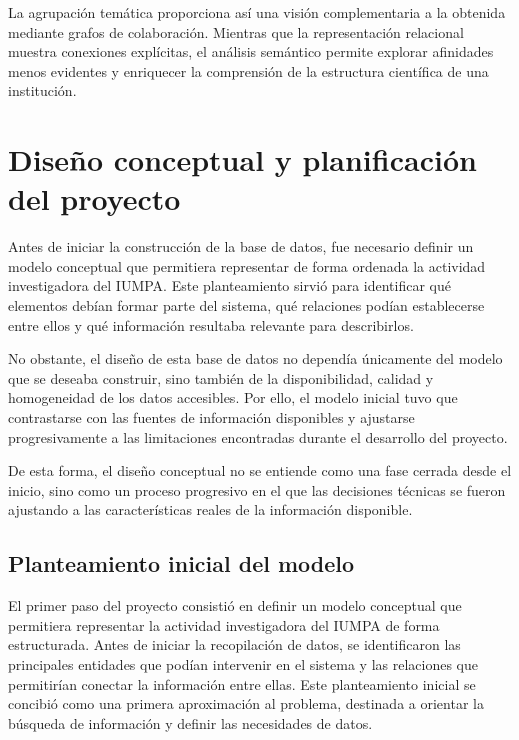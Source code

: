 \documentclass[11pt,spanish,listoffigures,listoftables]{tfgetsinf}
\begin{document}
La agrupación temática proporciona así una visión complementaria a la obtenida mediante grafos de colaboración. Mientras que la representación relacional muestra conexiones explícitas, el análisis semántico permite explorar afinidades menos evidentes y enriquecer la comprensión de la estructura científica de una institución.



\chapter{Diseño conceptual y planificación del proyecto}

Antes de iniciar la construcción de la base de datos, fue necesario definir un modelo conceptual que permitiera representar de forma ordenada la actividad investigadora del IUMPA. Este planteamiento sirvió para identificar qué elementos debían formar parte del sistema, qué relaciones podían establecerse entre ellos y qué información resultaba relevante para describirlos.

No obstante, el diseño de esta base de datos no dependía únicamente del modelo que se deseaba construir, sino también de la disponibilidad, calidad y homogeneidad de los datos accesibles. Por ello, el modelo inicial tuvo que contrastarse con las fuentes de información disponibles y ajustarse progresivamente a las limitaciones encontradas durante el desarrollo del proyecto.

De esta forma, el diseño conceptual no se entiende como una fase cerrada desde el inicio, sino como un proceso progresivo en el que las decisiones técnicas se fueron ajustando a las características reales de la información disponible.

\section{Planteamiento inicial del modelo}

El primer paso del proyecto consistió en definir un modelo conceptual que permitiera representar la actividad investigadora del IUMPA de forma estructurada. Antes de iniciar la recopilación de datos, se identificaron las principales entidades que podían intervenir en el sistema y las relaciones que permitirían conectar la información entre ellas. Este planteamiento inicial se concibió como una primera aproximación al problema, destinada a orientar la búsqueda de información y definir las necesidades de datos.
\end{document}

